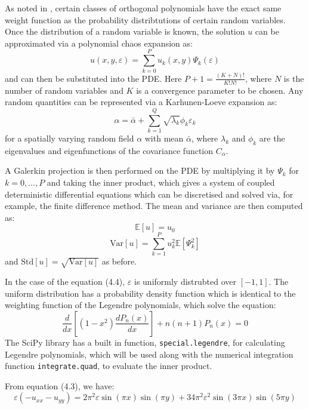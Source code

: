 \documentclass{article}
\numberwithin{equation}{section}
\begin{document}
As noted in \cite{Xiu}, certain classes of orthogonal polynomials have the exact same weight function as the probability distribtutions of certain random variables. Once the distribution of a random variable is known, the solution $u$ can be approximated via a polynomial chaos expansion as:
\begin{equation}
u(x,y,\varepsilon) = \sum_{k=0}^P u_k(x,y) \Psi_k(\varepsilon)
\end{equation}
and can then be substituted into the PDE. Here $P+1 = \frac{(K+N)!}{K!N!}$, where $N$ is the number of random variables and $K$ is a convergence parameter to be chosen. Any random quantities can be represented via a Karhunen-Loeve expansion as:
\begin{equation}
\alpha =  \bar{\alpha} + \sum_{k=1}^{Q}  \sqrt{\lambda_k} \phi_k \varepsilon_k
\end{equation}
for a spatially varying random field $\alpha$ with mean $\bar{\alpha}$, where $\lambda_k$ and $\phi_k$ are the eigenvalues and eigenfunctions of the covariance function $C_\alpha$.


A Galerkin projection is then performed on the PDE by multiplying it by $\Psi_k$ for $k=0, \dots, P$ and taking the inner product, which gives a system of coupled deterministic differential equations which can be discretised and solved via, for example, the finite difference method. The mean and variance are then computed as:
\begin{equation}
\mathbb{E}[u] = u_0
\end{equation}
\begin{equation}
\text{Var}[u] = \sum_{k=1}^P u_k^2 \mathbb{E}[\Psi_k^2]
\end{equation}
and $\text{Std}[u] = \sqrt{\text{Var}[u]}$ as before. 

In the case of the equation (4.4), $\varepsilon$ is uniformly distrubted over $[-1,1]$. The uniform distribution has a probability density function which is identical to the weighting function of the Legendre polynomials, which solve the equation:
\begin{equation}
\frac{d}{dx} \left[ (1-x^2) \frac{dP_n(x)}{dx} \right] + n(n+1) P_n(x) = 0 
\end{equation}
The SciPy library has a built in function, \texttt{special.legendre}, for calculating Legendre polynomials, which will be used along with the numerical integration function \texttt{integrate.quad}, to evaluate the inner product. 

From equation (4.3), we have:
\begin{equation}
\varepsilon(- u_{xx} - u_{yy}) = 2\pi^2 \varepsilon \sin(\pi x) \sin(\pi y)+ 34 \pi^2 \varepsilon^2 \sin(3 \pi x) \sin(5 \pi y) 
\end{equation}
\end{document}
